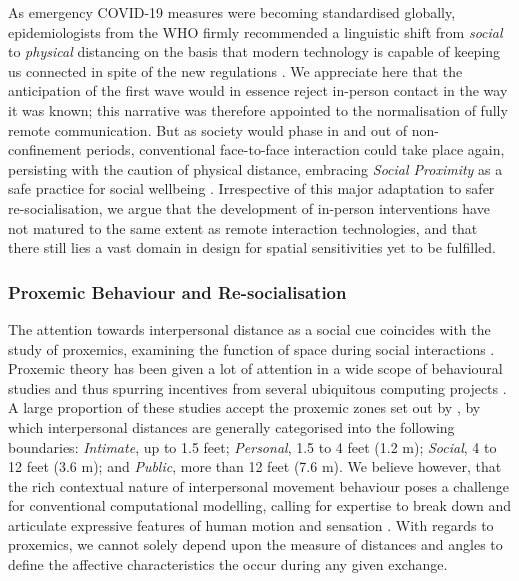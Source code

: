 As emergency COVID-19 measures were becoming standardised globally, epidemiologists from the WHO firmly recommended a linguistic shift from \textit{social} to \textit{physical} distancing on the basis that modern technology is capable of keeping us connected in spite of the new regulations \citep{romania_interactional_2020}. We appreciate here that the anticipation of the first wave would in essence reject in-person contact in the way it was known; this narrative was therefore appointed to the normalisation of fully remote communication. But as society would phase in and out of non-confinement periods, conventional face-to-face interaction could take place again, persisting with the caution of physical distance, embracing \textit{Social Proximity} as a safe practice for social wellbeing \cite{long_covid-19_2021}. Irrespective of this major adaptation to safer re-socialisation, we argue that the development of in-person interventions have not matured to the same extent as remote interaction technologies, and that there still lies a vast domain in design for spatial sensitivities yet to be fulfilled.

\subsubsection{Proxemic Behaviour and Re-socialisation}
\label{subsec:Proxemic}

The attention towards interpersonal distance as a social cue coincides with the study of proxemics, examining the function of space during social interactions \citep{hall_hidden_1966, guerrero_proxemics_2015}. Proxemic theory has been given a lot of attention in a wide scope of behavioural studies \citep{mccall_mapping_2017} and thus spurring incentives from several ubiquitous computing projects \citep{perez_mobile_2020, marquardt_proxemic_2015}. A large proportion of these studies accept the proxemic zones set out by \cite{hall_hidden_1966}, by which interpersonal distances are generally categorised into the following boundaries: \textit{Intimate}, up to 1.5 feet; \textit{Personal}, 1.5 to 4 feet (1.2 m); \textit{Social}, 4 to 12 feet (3.6 m); and \textit{Public}, more than 12 feet (7.6 m). We believe however, that the rich contextual nature of interpersonal movement behaviour poses a challenge for conventional computational modelling, calling for expertise to break down and articulate expressive features of human motion and sensation \citep{fdili_alaoui_how_2015,schiphorst_self-evidence_2011}. With regards to proxemics, we cannot solely depend upon the measure of distances and angles to define the affective characteristics the occur during any given exchange.

